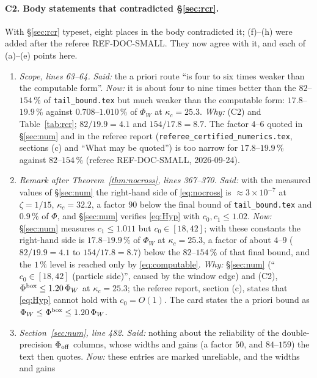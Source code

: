 \documentclass[11pt]{article}
\begin{document}
\paragraph{C2. Body statements that contradicted \S\ref{sec:rcr}.}  With \S\ref{sec:rcr} typeset,
eight places in the body contradicted it; (f)--(h) were added after the referee REF-DOC-SMALL.  They now agree with it, and each of (a)--(e) points here.
\begin{enumerate}[label=(\alph*),leftmargin=2.4em]
\item \emph{Scope, lines 63--64.}  \emph{Said:} the a priori route ``is four to six times weaker
 than the computable form''.  \emph{Now:} it is about four to nine times better than the
 $82$--$154\,\%$ of \texttt{tail\_bound.tex} but much weaker than the computable form:
 $17.8$--$19.9\,\%$ against $0.708$--$1.010\,\%$ of $\Phi_W$ at $\kappa_c=25.3$.  \emph{Why:} (C2)
 and Table~\ref{tab:rcr}; $82/19.9=4.1$ and $154/17.8=8.7$.  The factor $4$--$6$ quoted in
 \S\ref{sec:num} and in the referee report (\texttt{referee\_certified\_numerics.tex}, sections (c)
 and ``What may be quoted'') is too narrow for $17.8$--$19.9\,\%$ against $82$--$154\,\%$
 (referee REF-DOC-SMALL, 2026-09-24).
\item \emph{Remark after Theorem~\ref{thm:nocross}, lines 367--370.}  \emph{Said:} with the
 measured values of \S\ref{sec:num} the right-hand side of \eqref{eq:nocross} is
 $\approx3\times10^{-7}$ at $\zeta=1/15$, $\kappa_c=32.2$, a factor $90$ below the final bound of
 \texttt{tail\_bound.tex} and $0.9\,\%$ of $\Phi$, and \S\ref{sec:num} verifies \eqref{eq:Hyp}
 with $c_0,c_1\le1.02$.  \emph{Now:} \S\ref{sec:num} measures $c_1\le1.011$ but $c_0\in[18,42]$;
 with these constants the right-hand side is $17.8$--$19.9\,\%$ of $\Phi_W$ at $\kappa_c=25.3$, a
 factor of about $4$--$9$ ($82/19.9=4.1$ to $154/17.8=8.7$) below the $82$--$154\,\%$ of that final bound, and the $1\,\%$ level is reached
 only by \eqref{eq:computable}.  \emph{Why:} \S\ref{sec:num} (``$c_0\in[18,42]$ (particle
 side)'', caused by the window edge) and (C2), $\Phi^{\rm box}\le1.20\,\Phi_W$ at
 $\kappa_c=25.3$; the referee report, section (c), states that \eqref{eq:Hyp} cannot hold with
 $c_0=O(1)$.  The card states the a priori bound as $\Phi_W\le\Phi^{\rm box}\le1.20\,\Phi_W$.
\item \emph{Section~\ref{sec:num}, line 482.}  \emph{Said:} nothing about the reliability of the
 double-precision $\Phi_{\rm off}$ columns, whose widths and gains (a factor $50$, and $84$--$159$)
 the text then quotes.  \emph{Now:} these entries are marked unreliable, and the widths and gains

\end{enumerate}
\end{document}
